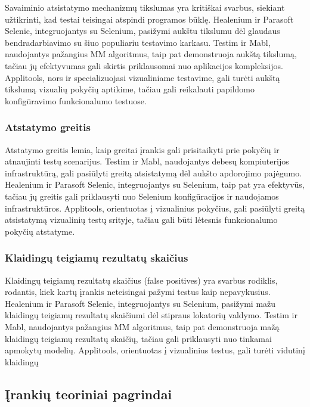 \documentclass[
]{VUMIFPSkursinis}
\begin{document}
Savaiminio atsistatymo mechanizmų tikslumas yra kritiškai svarbus, siekiant užtikrinti, kad testai teisingai atspindi programos būklę. Healenium ir Parasoft Selenic, integruojantys su Selenium, pasižymi aukštu tikslumu dėl glaudaus bendradarbiavimo su šiuo populiariu testavimo karkasu. Testim ir Mabl, naudojantys pažangius MM algoritmus, taip pat demonstruoja aukštą tikslumą, tačiau jų efektyvumas gali skirtis priklausomai nuo aplikacijos kompleksijos. Applitools, nors ir specializuojasi vizualiniame testavime, gali turėti aukštą tikslumą vizualių pokyčių aptikime, tačiau gali reikalauti papildomo konfigūravimo funkcionalumo testuose.

\subsubsection{Atstatymo greitis}

Atstatymo greitis lemia, kaip greitai įrankis gali prisitaikyti prie pokyčių ir atnaujinti testų scenarijus. Testim ir Mabl, naudojantys debesų kompiuterijos infrastruktūrą, gali pasiūlyti greitą atsistatymą dėl aukšto apdorojimo pajėgumo. Healenium ir Parasoft Selenic, integruojantys su Selenium, taip pat yra efektyvūs, tačiau jų greitis gali priklausyti nuo Selenium konfigūracijos ir naudojamos infrastruktūros. Applitools, orientuotas į vizualinius pokyčius, gali pasiūlyti greitą atsistatymą vizualinių testų srityje, tačiau gali būti lėtesnis funkcionalumo pokyčių atstatyme.

\subsubsection{Klaidingų teigiamų rezultatų skaičius}

Klaidingų teigiamų rezultatų skaičius (false positives) yra svarbus rodiklis, rodantis, kiek kartų įrankis neteisingai pažymi testus kaip nepavykusius. Healenium ir Parasoft Selenic, integruojantys su Selenium, pasižymi mažu klaidingų teigiamų rezultatų skaičiumi dėl stipraus lokatorių valdymo. Testim ir Mabl, naudojantys pažangius MM algoritmus, taip pat demonstruoja mažą klaidingų teigiamų rezultatų skaičių, tačiau gali priklausyti nuo tinkamai apmokytų modelių. Applitools, orientuotas į vizualinius testus, gali turėti vidutinį klaidingų

\subsection{Įrankių teoriniai pagrindai}
\end{document}
